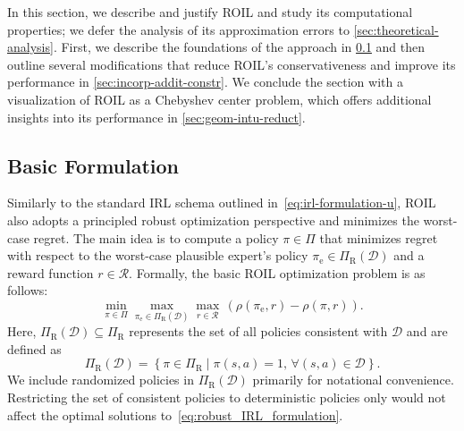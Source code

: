 \documentclass[10pt]{article}
\theoremstyle{plain}
\theoremstyle{remark}
\begin{document}

In this section, we describe and justify ROIL and study its computational properties; we defer the analysis of its approximation errors to \cref{sec:theoretical-analysis}. First, we describe the foundations of the approach in \cref{sec:basic-formulation} and then outline several modifications that reduce ROIL's conservativeness and improve its performance in \cref{sec:incorp-addit-constr}. We conclude the section with a visualization of ROIL as a Chebyshev center problem, which offers additional insights into its performance in \cref{sec:geom-intu-reduct}.  


\subsection{Basic Formulation}
\label{sec:basic-formulation}

Similarly to the standard IRL schema outlined in~\eqref{eq:irl-formulation-u}, ROIL also adopts a principled robust optimization perspective and minimizes the worst-case regret.  The main idea is to compute a policy $\pi\in \Pi$ that minimizes regret with respect to the worst-case plausible expert's policy $\pi_{\mathrm{e}} \in \Pi_{\mathrm{R}}(\mathcal{D})$ and a reward function $r\in \mathcal{R}$. Formally, the basic ROIL optimization problem is as follows:
\begin{equation}
\label{eq:robust_IRL_formulation}
\min_{\pi \in \Pi}  \max_{\pi_{\mathrm{e}} \in \Pi_{\mathrm{R}}(\mathcal{D})} \max_{r \in \mathcal{R}} \,
\left(\rho(\pi_{\mathrm{e}}, r) - \rho(\pi, r)\right).
\end{equation}
Here, $ \Pi_{\mathrm{R}}(\mathcal{D}) \subseteq \Pi_{\mathrm{R}}$ represents the set of all policies consistent with $\mathcal{D}$ and are defined as 
%
\begin{equation} \label{eq:consistent-policies}
\Pi_{\mathrm{R}}(\mathcal{D}) = \left\{ \pi \in \Pi_{\mathrm{R}} \mid \pi(s,a) = 1, \, \forall (s,a) \in \mathcal{D} \right\}.
\end{equation}
We include randomized policies in $\Pi_{\mathrm{R}}(\mathcal{D})$ primarily for notational convenience. Restricting the set of consistent policies to deterministic policies only would not affect the optimal solutions to~\eqref{eq:robust_IRL_formulation}.
\end{document}
